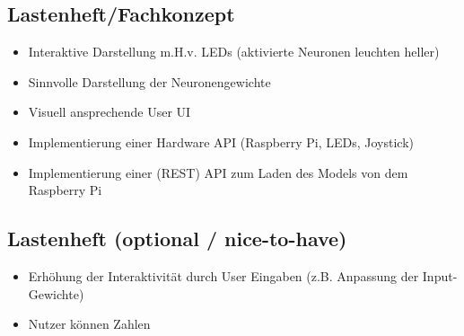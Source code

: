 \subsection{Lastenheft/Fachkonzept}
\label{sec:Lastenheft}
\begin{itemize}
	\item Interaktive Darstellung m.H.v. LEDs (aktivierte Neuronen leuchten heller)
	\item Sinnvolle Darstellung der Neuronengewichte
	\item Visuell ansprechende User UI
	\item Implementierung einer Hardware API (Raspberry Pi, LEDs, Joystick)
	\item Implementierung einer (REST) API zum Laden des Models von dem Raspberry Pi
\end{itemize}

\subsection{Lastenheft (optional / nice-to-have)}
\label{sec:Lastenheft2}
\begin{itemize}
	\item Erh\"ohung der Interaktivit\"at durch User Eingaben (z.B. Anpassung der Input-Gewichte)
	\item Nutzer k\"onnen Zahlen 
\end{itemize}
%
